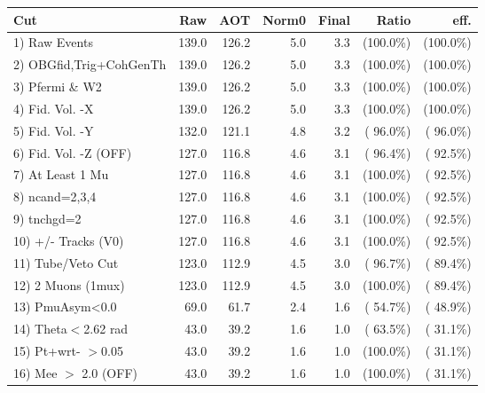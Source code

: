  \begin{table}[h!]\centering
 \begin{tabular}{||l||r|r|r|r|r|r||}
 \hline
 \hline
 Cut & Raw & AOT & Norm0 & Final & Ratio & eff.       \\
 \hline
  1) Raw Events           &        139.0 &        126.2 &          5.0 &          3.3 & (100.0\%) & (100.0\%) \\
  2) OBGfid,Trig+CohGenTh &        139.0 &        126.2 &          5.0 &          3.3 & (100.0\%) & (100.0\%) \\
  3) Pfermi \& W2         &        139.0 &        126.2 &          5.0 &          3.3 & (100.0\%) & (100.0\%) \\
  4) Fid. Vol. -X         &        139.0 &        126.2 &          5.0 &          3.3 & (100.0\%) & (100.0\%) \\
  5) Fid. Vol. -Y         &        132.0 &        121.1 &          4.8 &          3.2 & ( 96.0\%) & ( 96.0\%) \\
  6) Fid. Vol. -Z (OFF)   &        127.0 &        116.8 &          4.6 &          3.1 & ( 96.4\%) & ( 92.5\%) \\
  7) At Least 1 Mu        &        127.0 &        116.8 &          4.6 &          3.1 & (100.0\%) & ( 92.5\%) \\
  8) ncand=2,3,4          &        127.0 &        116.8 &          4.6 &          3.1 & (100.0\%) & ( 92.5\%) \\
  9) tnchgd=2             &        127.0 &        116.8 &          4.6 &          3.1 & (100.0\%) & ( 92.5\%) \\
 10) +/- Tracks (V0)      &        127.0 &        116.8 &          4.6 &          3.1 & (100.0\%) & ( 92.5\%) \\
 11) Tube/Veto Cut        &        123.0 &        112.9 &          4.5 &          3.0 & ( 96.7\%) & ( 89.4\%) \\
 12) 2 Muons (1mux)       &        123.0 &        112.9 &          4.5 &          3.0 & (100.0\%) & ( 89.4\%) \\
 13) PmuAsym<0.0          &         69.0 &         61.7 &          2.4 &          1.6 & ( 54.7\%) & ( 48.9\%) \\
 14) Theta$<$2.62 rad     &         43.0 &         39.2 &          1.6 &          1.0 & ( 63.5\%) & ( 31.1\%) \\
 15) Pt+wrt- $>$0.05      &         43.0 &         39.2 &          1.6 &          1.0 & (100.0\%) & ( 31.1\%) \\
 16) Mee $>$ 2.0  (OFF)   &         43.0 &         39.2 &          1.6 &          1.0 & (100.0\%) & ( 31.1\%) \\

\end{tabular}
\end{table}
